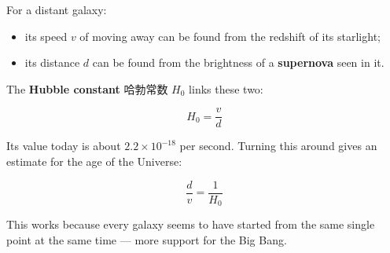 \documentclass[11pt]{article}
\begin{document}
For a distant galaxy:

\begin{itemize}
\item its speed $v$ of moving away can be found from the redshift of its starlight;

\item its distance $d$ can be found from the brightness of a \textbf{supernova} seen in it.

\end{itemize}

The \textbf{Hubble constant} 哈勃常数 $H_0$ links these two:

\[
H_0 = \frac{v}{d}
\]

Its value today is about $2.2 \times 10^{-18}$ per second. Turning this around gives an estimate for the age of the Universe:

\[
\frac{d}{v} = \frac{1}{H_0}
\]

This works because every galaxy seems to have started from the same single point at the same time — more support for the Big Bang.
\end{document}
